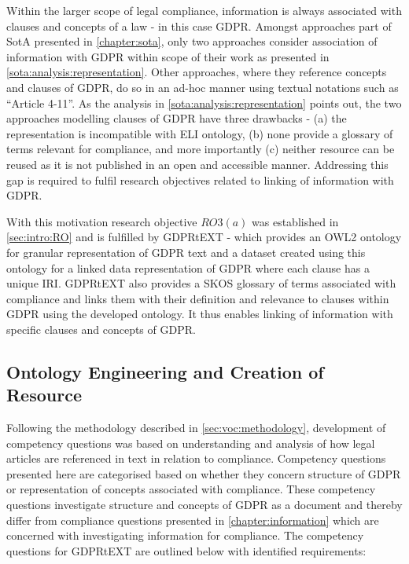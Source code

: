 Within the larger scope of legal compliance, information is always associated with clauses and concepts of a law - in this case GDPR.
Amongst approaches part of SotA presented in \autoref{chapter:sota}, only two approaches consider association of information with GDPR within scope of their work as presented in \autoref{sota:analysis:representation}.
Other approaches, where they reference concepts and clauses of GDPR, do so in an ad-hoc manner using textual notations such as ``Article 4-11''.
As the analysis in \autoref{sota:analysis:representation} points out, the two approaches modelling clauses of GDPR have three drawbacks - (a) the representation is incompatible with ELI ontology, (b) none provide a glossary of terms relevant for compliance, and more importantly (c) neither resource can be reused as it is not published in an open and accessible manner.
Addressing this gap is required to fulfil research objectives related to linking of information with GDPR.

With this motivation research objective $RO3(a)$ was established in \autoref{sec:intro:RO} and is fulfilled by GDPRtEXT - which provides an OWL2 ontology for granular representation of GDPR text and a dataset created using this ontology for a linked data representation of GDPR where each clause has a unique IRI.
GDPRtEXT also provides a SKOS glossary of terms associated with compliance and links them with their definition and relevance to clauses within GDPR using the developed ontology. 
It thus enables linking of information with specific clauses and concepts of GDPR.

\subsection{Ontology Engineering and Creation of Resource}\label{sec:voc:gdprtext-engineering}
Following the methodology described in \autoref{sec:voc:methodology},  development of competency questions was based on understanding and analysis of how legal articles are referenced in text in relation to compliance.
Competency questions presented here are categorised based on whether they concern structure of GDPR or representation of concepts associated with compliance. These competency questions investigate structure and concepts of GDPR as a document and thereby differ from compliance questions presented in \autoref{chapter:information} which are concerned with investigating information for compliance. The competency questions for GDPRtEXT are outlined below with identified requirements:

